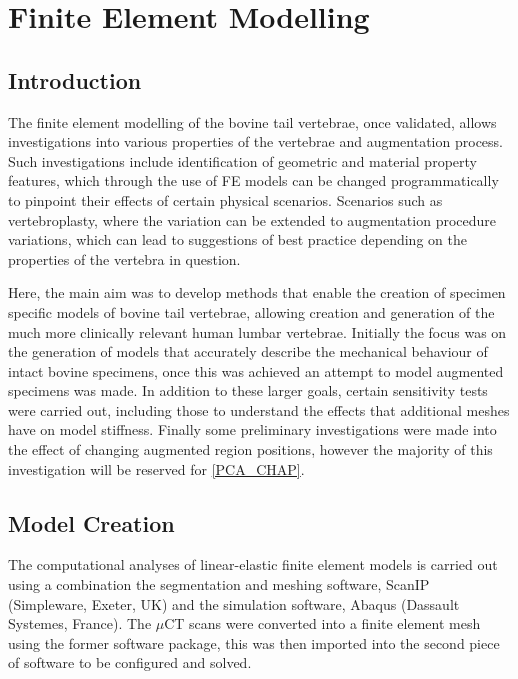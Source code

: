 \section{Finite Element Modelling}\label{finite-element-modelling-methods}

\subsection{Introduction}

The finite element modelling of the bovine tail vertebrae, once validated,
allows investigations into various properties of the vertebrae and augmentation
process.  Such investigations include identification of geometric and material
property features, which through the use of FE models can be changed
programmatically to pinpoint their effects of certain physical scenarios.
Scenarios such as vertebroplasty, where the variation can be extended to
augmentation procedure variations, which can lead to suggestions of best
practice depending on the properties of the vertebra in question.

Here, the main aim was to develop methods that enable the creation of specimen
specific models of bovine tail vertebrae, allowing creation and generation of
the much more clinically relevant human lumbar vertebrae.  Initially the focus
was on the generation of models that accurately describe the mechanical
behaviour of intact bovine specimens, once this was achieved an attempt to
model augmented specimens was made. In addition to these larger goals, certain
sensitivity tests were carried out, including those to understand the effects
that additional meshes have on model stiffness.  Finally some preliminary
investigations were made into the effect of changing augmented region
positions, however the majority of this investigation will be reserved for
\cref{PCA_CHAP}.

\subsection{Model Creation}\label{model-creation}

The computational analyses of linear-elastic finite element models is carried
out using a combination the segmentation and meshing software, ScanIP
(Simpleware, Exeter, UK) and the simulation software, Abaqus (Dassault
Systemes, France). The $\mu$CT scans were converted into a finite element mesh
using the former software package, this was then imported into the second piece
of software to be configured and solved.


